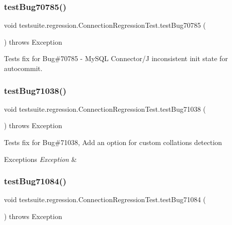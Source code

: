 \subsubsection{\texorpdfstring{test\+Bug70785()}{testBug70785()}}
{\footnotesize\ttfamily void testsuite.\+regression.\+Connection\+Regression\+Test.\+test\+Bug70785 (\begin{DoxyParamCaption}{ }\end{DoxyParamCaption}) throws Exception}

Tests fix for Bug\#70785 -\/ My\+S\+QL Connector/J inconsistent init state for autocommit. \mbox{\label{classtestsuite_1_1regression_1_1_connection_regression_test_af4f6635f25a74604468a8f9445e365ba}} 
\subsubsection{\texorpdfstring{test\+Bug71038()}{testBug71038()}}
{\footnotesize\ttfamily void testsuite.\+regression.\+Connection\+Regression\+Test.\+test\+Bug71038 (\begin{DoxyParamCaption}{ }\end{DoxyParamCaption}) throws Exception}

Tests fix for Bug\#71038, Add an option for custom collations detection


\begin{DoxyExceptions}{Exceptions}
{\em Exception} & \\
\hline
\end{DoxyExceptions}
\mbox{\label{classtestsuite_1_1regression_1_1_connection_regression_test_aa979b5c63116b99ad91121c84a0af973}} 
\subsubsection{\texorpdfstring{test\+Bug71084()}{testBug71084()}}
{\footnotesize\ttfamily void testsuite.\+regression.\+Connection\+Regression\+Test.\+test\+Bug71084 (\begin{DoxyParamCaption}{ }\end{DoxyParamCaption}) throws Exception}

